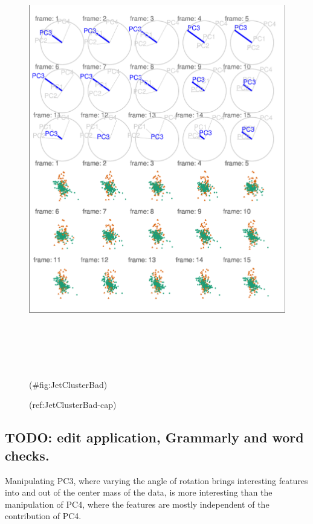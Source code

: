 \begin{Schunk}
\begin{figure}

{\centering \includegraphics[width=6in,height=7.2in]{spinifex_paper_files/figure-latex/JetClusterBad-1} 

}

\caption[(ref:JetClusterBad-cap)]{(ref:JetClusterBad-cap)}(\#fig:JetClusterBad)
\end{figure}
\end{Schunk}

\hypertarget{todo-edit-application-grammarly-and-word-checks.}{%
\subsection{TODO: edit application, Grammarly and word checks.}\label{todo-edit-application-grammarly-and-word-checks.}}

Manipulating PC3, where varying the angle of rotation brings interesting features into and out of the center mass of the data, is more interesting than the manipulation of PC4, where the features are mostly independent of the contribution of PC4.

